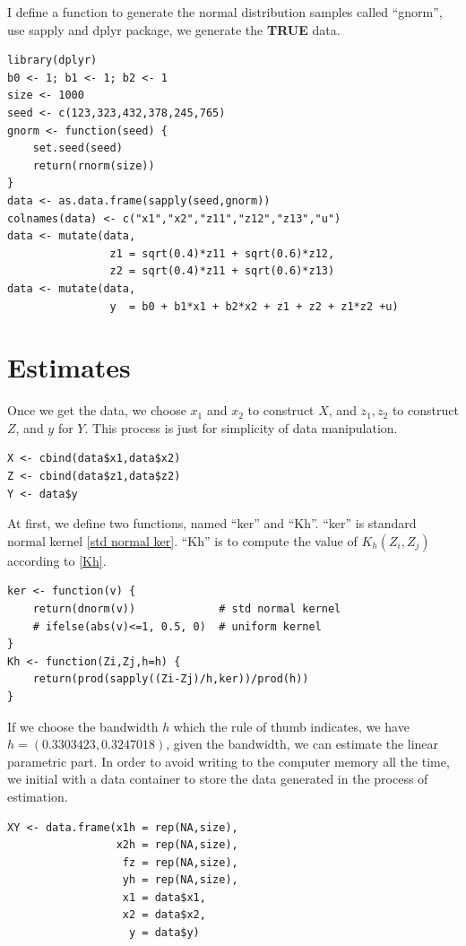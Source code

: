 \documentclass{article}
\begin{document}
I define a function to generate the normal distribution samples called ``gnorm'', use sapply and dplyr package, we generate the \textbf{TRUE} data.

\begin{lstlisting}
library(dplyr)
b0 <- 1; b1 <- 1; b2 <- 1
size <- 1000
seed <- c(123,323,432,378,245,765)
gnorm <- function(seed) {
    set.seed(seed)
    return(rnorm(size))
}
data <- as.data.frame(sapply(seed,gnorm))
colnames(data) <- c("x1","x2","z11","z12","z13","u")
data <- mutate(data,
                z1 = sqrt(0.4)*z11 + sqrt(0.6)*z12,
                z2 = sqrt(0.4)*z11 + sqrt(0.6)*z13)
data <- mutate(data,
                y  = b0 + b1*x1 + b2*x2 + z1 + z2 + z1*z2 +u)
\end{lstlisting}

\section{Estimates}
Once we get the data, we choose $x_{1}$ and $x_{2}$ to construct $X$, and $z_{1},z_{2}$ to construct $Z$, and $y$ for $Y$. This process is just for simplicity of data manipulation.

\begin{lstlisting}
X <- cbind(data$x1,data$x2)
Z <- cbind(data$z1,data$z2)
Y <- data$y
\end{lstlisting}


At first, we define two functions, named ``ker'' and ``Kh''. ``ker'' is standard normal kernel \eqref{std normal ker}. ``Kh'' is to compute the value of $K_{h}(Z_{i},Z_{j})$ according to \eqref{Kh}.

\begin{lstlisting}
ker <- function(v) {
    return(dnorm(v))             # std normal kernel
    # ifelse(abs(v)<=1, 0.5, 0)  # uniform kernel
}
Kh <- function(Zi,Zj,h=h) {
    return(prod(sapply((Zi-Zj)/h,ker))/prod(h))
}
\end{lstlisting}

If we choose the bandwidth $h$ which the rule of thumb indicates, we have $h=(0.3303423, 0.3247018)$, given the bandwidth, we can estimate the linear parametric part. In order to avoid writing to the computer memory all the time, we initial with a data container to store the data generated in the process of estimation.

\begin{lstlisting}
XY <- data.frame(x1h = rep(NA,size),
                 x2h = rep(NA,size),
                  fz = rep(NA,size),
                  yh = rep(NA,size),
                  x1 = data$x1,
                  x2 = data$x2,
                   y = data$y)
\end{lstlisting}
\end{document}
